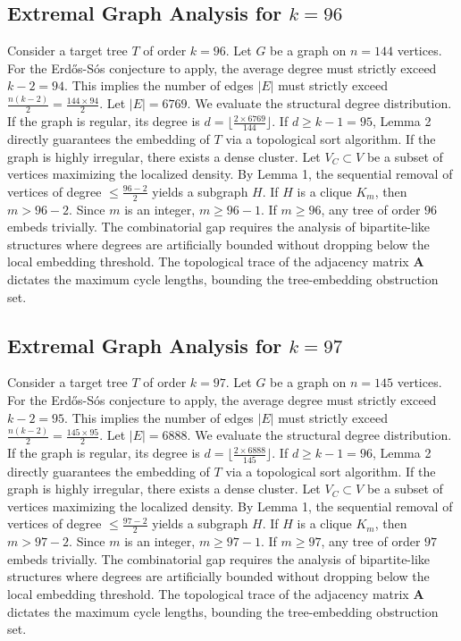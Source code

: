 \documentclass[11pt,a4paper]{article}
\begin{document}
\subsection{Extremal Graph Analysis for $k=96$}
Consider a target tree $T$ of order $k=96$.
Let $G$ be a graph on $n=144$ vertices.
For the Erd\H{o}s-S\'os conjecture to apply, the average degree must strictly exceed $k-2 = 94$.
This implies the number of edges $|E|$ must strictly exceed $\frac{n(k-2)}{2} = \frac{144 \times 94}{2}$.
Let $|E| = 6769$.
We evaluate the structural degree distribution. If the graph is regular, its degree is $d = \lfloor \frac{2 \times 6769}{144} \rfloor$.
If $d \geq k-1 = 95$, Lemma 2 directly guarantees the embedding of $T$ via a topological sort algorithm.
If the graph is highly irregular, there exists a dense cluster. Let $V_C \subset V$ be a subset of vertices maximizing the localized density.
By Lemma 1, the sequential removal of vertices of degree $\leq \frac{96-2}{2}$ yields a subgraph $H$.
If $H$ is a clique $K_{m}$, then $m > 96-2$. Since $m$ is an integer, $m \geq 96-1$. If $m \geq 96$, any tree of order $96$ embeds trivially.
The combinatorial gap requires the analysis of bipartite-like structures where degrees are artificially bounded without dropping below the local embedding threshold. The topological trace of the adjacency matrix $\mathbf{A}$ dictates the maximum cycle lengths, bounding the tree-embedding obstruction set.


\subsection{Extremal Graph Analysis for $k=97$}
Consider a target tree $T$ of order $k=97$.
Let $G$ be a graph on $n=145$ vertices.
For the Erd\H{o}s-S\'os conjecture to apply, the average degree must strictly exceed $k-2 = 95$.
This implies the number of edges $|E|$ must strictly exceed $\frac{n(k-2)}{2} = \frac{145 \times 95}{2}$.
Let $|E| = 6888$.
We evaluate the structural degree distribution. If the graph is regular, its degree is $d = \lfloor \frac{2 \times 6888}{145} \rfloor$.
If $d \geq k-1 = 96$, Lemma 2 directly guarantees the embedding of $T$ via a topological sort algorithm.
If the graph is highly irregular, there exists a dense cluster. Let $V_C \subset V$ be a subset of vertices maximizing the localized density.
By Lemma 1, the sequential removal of vertices of degree $\leq \frac{97-2}{2}$ yields a subgraph $H$.
If $H$ is a clique $K_{m}$, then $m > 97-2$. Since $m$ is an integer, $m \geq 97-1$. If $m \geq 97$, any tree of order $97$ embeds trivially.
The combinatorial gap requires the analysis of bipartite-like structures where degrees are artificially bounded without dropping below the local embedding threshold. The topological trace of the adjacency matrix $\mathbf{A}$ dictates the maximum cycle lengths, bounding the tree-embedding obstruction set.
\end{document}
